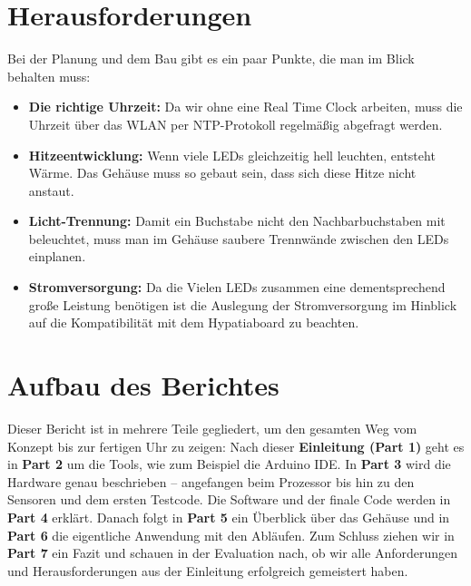 \section{Herausforderungen}
Bei der Planung und dem Bau gibt es ein paar Punkte, die man im Blick behalten muss:
\begin{itemize}
	\item \textbf{Die richtige Uhrzeit:} Da wir ohne eine Real Time Clock arbeiten, muss die Uhrzeit über das WLAN per NTP-Protokoll regelmäßig abgefragt werden. 
	\item \textbf{Hitzeentwicklung:} Wenn viele LEDs gleichzeitig hell leuchten, entsteht Wärme. Das Gehäuse muss so gebaut sein, dass sich diese Hitze nicht anstaut.
	\item \textbf{Licht-Trennung:} Damit ein Buchstabe nicht den Nachbarbuchstaben mit beleuchtet, muss man im Gehäuse saubere Trennwände zwischen den LEDs einplanen.
	\item \textbf{Stromversorgung:} Da die Vielen LEDs zusammen eine dementsprechend große Leistung benötigen ist die Auslegung der Stromversorgung im Hinblick auf die Kompatibilität mit dem Hypatiaboard zu beachten.  
\end{itemize}

\section{Aufbau des Berichtes} 
Dieser Bericht ist in mehrere Teile gegliedert, um den gesamten Weg vom Konzept bis zur fertigen Uhr zu zeigen:
Nach dieser \textbf{Einleitung (Part 1)} geht es in \textbf{Part 2} um die Tools, wie zum Beispiel die Arduino IDE. In \textbf{Part 3} wird die Hardware genau beschrieben – angefangen beim Prozessor bis hin zu den Sensoren und dem ersten Testcode. Die Software und der finale Code werden in \textbf{Part 4} erklärt. Danach folgt in \textbf{Part 5} ein Überblick über das Gehäuse und in \textbf{Part 6} die eigentliche Anwendung mit den Abläufen. Zum Schluss ziehen wir in \textbf{Part 7} ein Fazit und schauen in der Evaluation nach, ob wir alle Anforderungen und Herausforderungen aus der Einleitung erfolgreich gemeistert haben.



